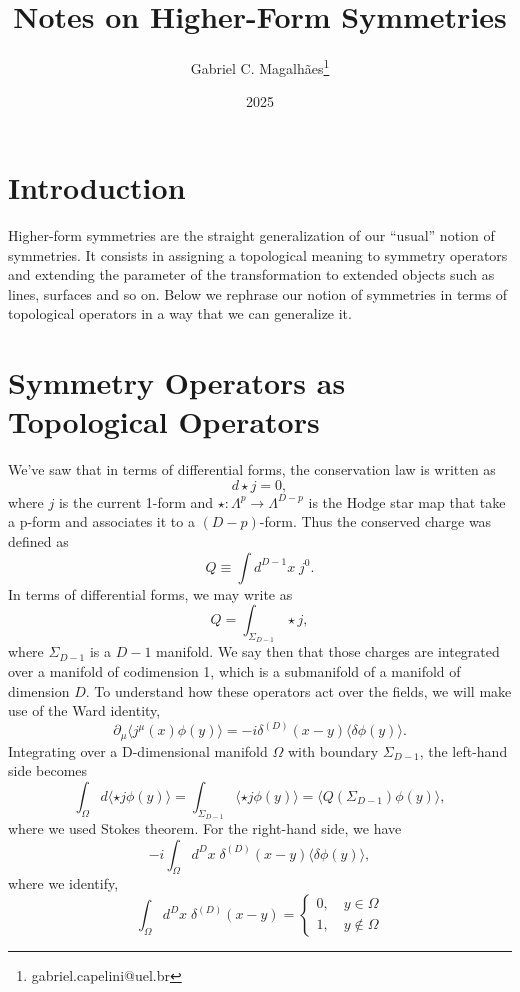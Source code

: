 \documentclass{article}
\title{Notes on Higher-Form Symmetries}
\author{Gabriel C. Magalhães\footnote{gabriel.capelini@uel.br}}
\date{2025}
\begin{document}
\maketitle

\section*{Introduction}
Higher-form symmetries are the straight generalization of our “usual” notion of symmetries. It consists in assigning a topological meaning to symmetry operators and extending the parameter of the transformation to extended objects such as lines, surfaces and so on. Below we rephrase our notion of symmetries in terms of topological operators in a way that we can generalize it. 

\section*{Symmetry Operators as Topological Operators}
We’ve saw that in terms of differential forms, the conservation law is written as
\begin{equation*}
	d\star j=0,
\end{equation*}
where $j$ is the current 1-form and $\star:\Lambda^p\to \Lambda^{D-p}$   is the Hodge star map that take a p-form and associates it to a $(D-p)$-form. Thus the conserved charge was defined as
\begin{equation*}
	Q\equiv\int d^{D-1}x\;j^0.
\end{equation*}
In terms of differential forms, we may write as
$$
Q=\int_{\Sigma_{D-1}}\star j,
$$
where $\Sigma_{D-1}$  is a $D-1$  manifold. We say then that those charges are integrated over a manifold of codimension 1, which is a submanifold of a manifold of dimension $D$.  To understand how these operators act over the fields, we will make use of the Ward identity,
$$
\partial_\mu\langle j^\mu(x)\phi(y)\rangle=-i\delta^{(D)}(x-y)\langle\delta\phi(y)\rangle.
$$
Integrating over a D-dimensional manifold $\Omega$  with boundary $\Sigma_{D-1}$, the left-hand side becomes
$$
\int_{\Omega}d\langle\star j\phi(y)\rangle=\int_{\Sigma_{D-1}}\langle\star j\phi(y)\rangle=\langle Q(\Sigma_{D-1})\phi(y)\rangle,
$$
where we used Stokes theorem. For the right-hand side, we have
$$
-i\int_{\Omega}d^Dx\;\delta^{(D)}(x-y)\langle\delta\phi(y)\rangle,
$$
where we identify,
$$
\int_{\Omega}d^Dx\;\delta^{(D)}(x-y)=\begin{cases}0,\quad y\in\Omega\\1,\quad y\not\in\Omega\end{cases}
$$
\end{document}
